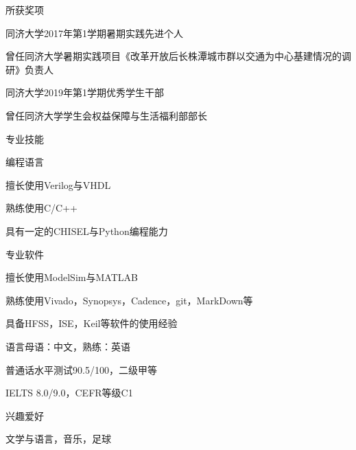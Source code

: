 \documentclass{resume} %
\begin{document}
\begin{rSection}{所获奖项}
	
	\begin{rSubsection}{同济大学}{2017年第1学期}{暑期实践先进个人}{}
		\item 曾任同济大学暑期实践项目《改革开放后长株潭城市群以交通为中心基建情况的调研》负责人
	\end{rSubsection}
		
	\begin{rSubsection}{同济大学}{2019年第1学期}{优秀学生干部}{}
		\item 曾任同济大学学生会权益保障与生活福利部部长
	\end{rSubsection}

\end{rSection}

\begin{rSection}{专业技能}
	
	\begin{rSubsection}{编程语言}{}{}{}
		\item 擅长使用Verilog与VHDL
		\item 熟练使用C/C++
		\item 具有一定的CHISEL与Python编程能力
	\end{rSubsection}

	\begin{rSubsection}{专业软件}{}{}{}
		\item 擅长使用ModelSim与MATLAB 
		\item 熟练使用Vivado，Synopsys，Cadence，git，MarkDown等
		\item 具备HFSS，ISE，Keil等软件的使用经验
	\end{rSubsection}

	\begin{rSubsection}{语言}{}{母语：中文，熟练：英语}{}
		\item 普通话水平测试90.5/100，二级甲等
		\item IELTS 8.0/9.0，CEFR等级C1
	\end{rSubsection}

\end{rSection}

\begin{rSection}{兴趣爱好}
	\item 文学与语言，音乐，足球
\end{rSection}
\end{document}
